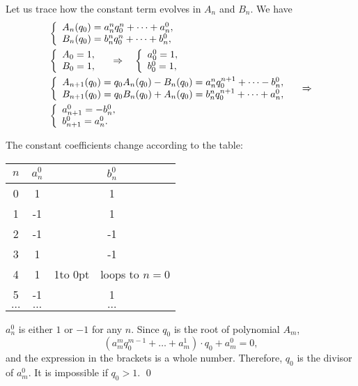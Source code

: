 \documentclass[draft, 10pt]{article} %
\begin{document}
Let us trace how the constant term evolves in $A_n$ and $B_n$.
We have
$$
\begin{array}{l}
%
\left\{\begin{array}{l}
A_n(q_0) = a_n^n q_0^n + \dots + a_n^0, \\
B_n(q_0) = b_n^n q_0^n + \dots + b_n^0,
\end{array}\right. \\[1em]
%
\left\{\begin{array}{l}
A_0=1, \\
B_0=1,
\end{array}\right.
\quad\ergo\quad
\left\{\begin{array}{l}
a_0^0 = 1, \\
b_0^0 = 1,
\end{array}\right. \\[1em]
%
\left\{\begin{array}{l}
A_{n+1}(q_0) = q_0 A_n(q_0) - B_n(q_0) = a_n^n q_0^{n+1} + \dots - b_n^0, \\
B_{n+1}(q_0) = q_0 B_n(q_0) + A_n(q_0) = b_n^n q_0^{n+1} + \dots + a_n^0,
\end{array}\right.  \quad\ergo \\[1em]
%
\left\{\begin{array}{l}
a_{n+1}^0 = - b_n^0, \\
b_{n+1}^0 = a_n^0.
\end{array}\right.
%
\end{array}
$$

The constant coefficients change according to the table:
\begin{center}
\begin{tabular}{ c | c | c }
$n$ & $a_n^0$ & $b_n^0$ \\
\hline
0 & 1 & 1 \\
1 & -1 & 1 \\
2 & -1 & -1 \\
3 & 1 & -1 \\
4 & 1 & 1\hbox to 0pt{$\quad$loops to $n=0$\hss} \\
5 & -1 & 1 \\
$\dots$ & $\dots$ & $\dots$ \\
\end{tabular}
\end{center}

$a_n^0$ is either $1$ or $-1$ for any $n$.
Since $q_0$ is the root of polynomial $A_m$,
$$
\left( a_m^m q_0^{m-1} + \dots + a_m^1 \right) \cdot q_0 + a_m^0 = 0,
$$
and the expression in the brackets is a whole number.
Therefore, $q_0$ is the divisor of $a_m^0$. It is impossible if $q_0>1$. \qed
\end{document}
